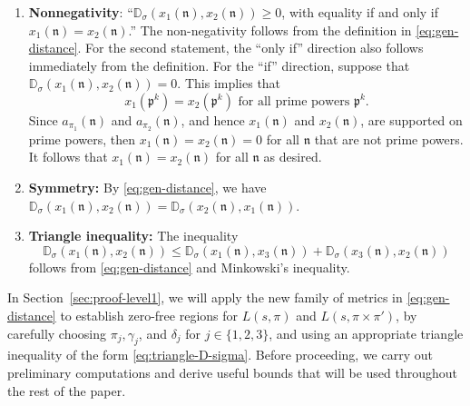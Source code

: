 \documentclass[12pt,reqno]{amsart}
\theoremstyle{remark}
\newcommand{\kn}{\mathfrak{n}}
\numberwithin{equation}{section}
\begin{document}
\begin{enumerate}
    \item \textbf{Nonnegativity}: ``$\mathbb{D}_{\sigma}(x_1(\mathfrak{n}), x_2(\mathfrak{n})) \ge 0$, with equality if and only if $x_1(\mathfrak{n}) = x_2(\mathfrak{n})$.'' The non-negativity follows from the definition in \eqref{eq:gen-distance}. For the second statement, the ``only if'' direction also follows immediately from the definition. For the ``if'' direction, suppose that $\mathbb{D}_{\sigma}(x_1(\mathfrak{n}), x_2(\mathfrak{n})) = 0$. This implies that 
    \[
    x_1(\mathfrak{p}^k) = x_2(\mathfrak{p}^k) \text{ for all prime powers } \mathfrak{p}^k.
    \]
    Since $a_{\pi_1}(\kn)$ and $a_{\pi_2}(\kn)$, and hence $x_1(\kn)$ and $x_2(\kn)$, are supported on prime powers, then $x_1(\mathfrak{n}) = x_2(\mathfrak{n}) = 0$ for all $\mathfrak{n}$ that are not prime powers. It follows that $x_1(\mathfrak{n}) = x_2(\mathfrak{n})$ for all $\mathfrak{n}$ as desired. 
    
    \item \textbf{Symmetry:} By \eqref{eq:gen-distance}, we have $\mathbb{D}_{\sigma}(x_1(\mathfrak{n}), x_2(\mathfrak{n})) = \mathbb{D}_{\sigma}(x_2(\mathfrak{n}), x_1(\mathfrak{n})).$
    
    \item \textbf{Triangle inequality:} The inequality
    \begin{equation} \label{eq:triangle-D-sigma}
    \mathbb{D}_{\sigma}(x_1(\mathfrak{n}), x_2(\mathfrak{n})) \le \mathbb{D}_{\sigma}(x_1(\mathfrak{n}), x_3(\mathfrak{n})) + \mathbb{D}_{\sigma}(x_3(\mathfrak{n}), x_2(\mathfrak{n}))
    \end{equation}
    follows from \eqref{eq:gen-distance} and Minkowski’s inequality.
\end{enumerate}

In Section~\ref{sec:proof-level1}, we will apply the new family of metrics in \eqref{eq:gen-distance} to establish zero-free regions for  $L(s, \pi)$ and $L(s, \pi \times \pi')$, by carefully choosing $\pi_j, \gamma_j$, and $\delta_j$ for $j \in \{1,2,3\}$, and using an appropriate triangle inequality of the form \eqref{eq:triangle-D-sigma}. Before proceeding, we carry out preliminary computations and derive useful bounds that will be used throughout the rest of the paper. %

    
\end{document}
